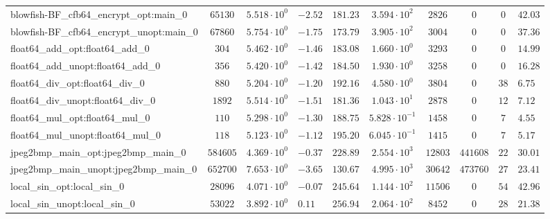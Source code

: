 \begin{tabular}{|l|c|HHc|c|c|c|cH|}
blowfish-BF\_cfb64\_encrypt\_opt:main\_0        & $ 65130    $ & $ 5.518 \cdot 10^{0} $ & $ -2.52 $ & $ 181.23 $ & $ 3.594 \cdot 10^{2}  $ & $ 2826   $ & $ 0       $ & $ 0   $ & $ 42.03   $ \\
blowfish-BF\_cfb64\_encrypt\_unopt:main\_0      & $ 67860    $ & $ 5.754 \cdot 10^{0} $ & $ -1.75 $ & $ 173.79 $ & $ 3.905 \cdot 10^{2}  $ & $ 3004   $ & $ 0       $ & $ 0   $ & $ 37.36   $ \\
float64\_add\_opt:float64\_add\_0               & $ 304      $ & $ 5.462 \cdot 10^{0} $ & $ -1.46 $ & $ 183.08 $ & $ 1.660 \cdot 10^{0}  $ & $ 3293   $ & $ 0       $ & $ 0   $ & $ 14.99   $ \\
float64\_add\_unopt:float64\_add\_0             & $ 356      $ & $ 5.420 \cdot 10^{0} $ & $ -1.42 $ & $ 184.50 $ & $ 1.930 \cdot 10^{0}  $ & $ 3258   $ & $ 0       $ & $ 0   $ & $ 16.28   $ \\
float64\_div\_opt:float64\_div\_0               & $ 880      $ & $ 5.204 \cdot 10^{0} $ & $ -1.20 $ & $ 192.16 $ & $ 4.580 \cdot 10^{0}  $ & $ 3804   $ & $ 0       $ & $ 38  $ & $ 6.75    $ \\
float64\_div\_unopt:float64\_div\_0             & $ 1892     $ & $ 5.514 \cdot 10^{0} $ & $ -1.51 $ & $ 181.36 $ & $ 1.043 \cdot 10^{1}  $ & $ 2878   $ & $ 0       $ & $ 12  $ & $ 7.12    $ \\
float64\_mul\_opt:float64\_mul\_0               & $ 110      $ & $ 5.298 \cdot 10^{0} $ & $ -1.30 $ & $ 188.75 $ & $ 5.828 \cdot 10^{-1} $ & $ 1458   $ & $ 0       $ & $ 7   $ & $ 4.55    $ \\
float64\_mul\_unopt:float64\_mul\_0             & $ 118      $ & $ 5.123 \cdot 10^{0} $ & $ -1.12 $ & $ 195.20 $ & $ 6.045 \cdot 10^{-1} $ & $ 1415   $ & $ 0       $ & $ 7   $ & $ 5.17    $ \\
jpeg2bmp\_main\_opt:jpeg2bmp\_main\_0           & $ 584605   $ & $ 4.369 \cdot 10^{0} $ & $ -0.37 $ & $ 228.89 $ & $ 2.554 \cdot 10^{3}  $ & $ 12803  $ & $ 441608  $ & $ 22  $ & $ 30.01   $ \\
jpeg2bmp\_main\_unopt:jpeg2bmp\_main\_0         & $ 652700   $ & $ 7.653 \cdot 10^{0} $ & $ -3.65 $ & $ 130.67 $ & $ 4.995 \cdot 10^{3}  $ & $ 30642  $ & $ 473760  $ & $ 27  $ & $ 23.41   $ \\
local\_sin\_opt:local\_sin\_0                   & $ 28096    $ & $ 4.071 \cdot 10^{0} $ & $ -0.07 $ & $ 245.64 $ & $ 1.144 \cdot 10^{2}  $ & $ 11506  $ & $ 0       $ & $ 54  $ & $ 42.96   $ \\
local\_sin\_unopt:local\_sin\_0                 & $ 53022    $ & $ 3.892 \cdot 10^{0} $ & $ 0.11  $ & $ 256.94 $ & $ 2.064 \cdot 10^{2}  $ & $ 8452   $ & $ 0       $ & $ 28  $ & $ 21.38   $ \\

\end{tabular}
